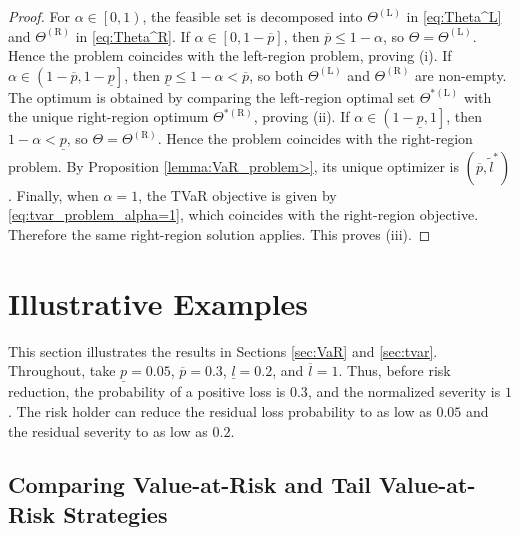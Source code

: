 \documentclass[a4paper,12pt]{article}
\begin{document}
\begin{proof}
For $\alpha\in\left[0,1\right)$, the feasible set is decomposed into $\Theta^{\left(\text{L}\right)}$ in \eqref{eq:Theta^L} and $\Theta^{\left(\text{R}\right)}$ in \eqref{eq:Theta^R}. If $\alpha\in\left[0,1-\overline{p}\right]$, then $\overline{p}\leq 1-\alpha$, so $\Theta=\Theta^{\left(\text{L}\right)}$. Hence the problem coincides with the left-region problem, proving (i). If $\alpha\in\left(1-\overline{p},1-\underline{p}\right]$, then $\underline{p}\leq 1-\alpha<\overline{p}$, so both $\Theta^{\left(\text{L}\right)}$ and $\Theta^{\left(\text{R}\right)}$ are non-empty. The optimum is obtained by comparing the left-region optimal set $\Theta^{*\left(\text{L}\right)}$ with the unique right-region optimum $\Theta^{*\left(\text{R}\right)}$, proving (ii). If $\alpha\in\left(1-\underline{p},1\right]$, then $1-\alpha<\underline{p}$, so  $\Theta=\Theta^{\left(\text{R}\right)}$. Hence the problem coincides with the right-region problem. By Proposition \ref{lemma:VaR_problem>}, its unique optimizer is $\left(\overline{p},\tilde{l}^*\right)$. Finally, when $\alpha=1$, the TVaR objective is given by \eqref{eq:tvar_problem_alpha=1}, which coincides with the right-region objective. Therefore the same right-region solution applies. This proves (iii).
\end{proof}

\section{Illustrative Examples}\label{sec:illustrative}

This section illustrates the results in Sections \ref{sec:VaR} and \ref{sec:tvar}. Throughout, take $\underline{p}=0.05$, $\overline{p}=0.3$, $\underline{l}=0.2$, and $\overline{l}=1$. Thus, before risk reduction, the probability of a positive loss is $0.3$, and the normalized severity is $1$. The risk holder can reduce the residual loss probability to as low as $0.05$ and the residual severity to as low as $0.2$.

\subsection{Comparing Value-at-Risk and Tail Value-at-Risk Strategies}\label{sec:quad_cost}
\end{document}

